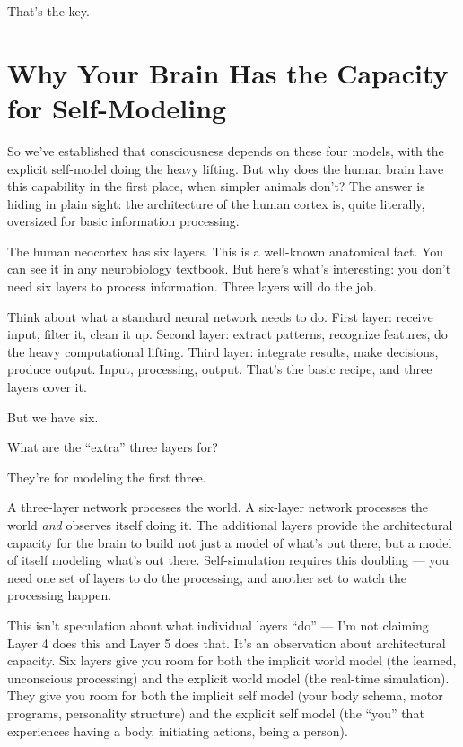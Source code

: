 \documentclass[11pt, twoside, openright]{book}
\begin{document}
That's the key.

\section*{Why Your Brain Has the Capacity\\for Self-Modeling}

So we've established that consciousness depends on these four models, with the explicit self-model doing the heavy lifting. But why does the human brain have this capability in the first place, when simpler animals don't? The answer is hiding in plain sight: the architecture of the human cortex is, quite literally, oversized for basic information processing.

The human neocortex has six layers. This is a well-known anatomical fact. You can see it in any neurobiology textbook. But here's what's interesting: you don't need six layers to process information. Three layers will do the job.

Think about what a standard neural network needs to do. First layer: receive input, filter it, clean it up. Second layer: extract patterns, recognize features, do the heavy computational lifting. Third layer: integrate results, make decisions, produce output. Input, processing, output. That's the basic recipe, and three layers cover it.

But we have six.

What are the ``extra'' three layers for?

They're for modeling the first three.

A three-layer network processes the world. A six-layer network processes the world \textit{and} observes itself doing it. The additional layers provide the architectural capacity for the brain to build not just a model of what's out there, but a model of itself modeling what's out there. Self-simulation requires this doubling --- you need one set of layers to do the processing, and another set to watch the processing happen.

This isn't speculation about what individual layers ``do'' --- I'm not claiming Layer 4 does this and Layer 5 does that. It's an observation about architectural capacity. Six layers give you room for both the implicit world model (the learned, unconscious processing) and the explicit world model (the real-time simulation). They give you room for both the implicit self model (your body schema, motor programs, personality structure) and the explicit self model (the ``you'' that experiences having a body, initiating actions, being a person).
\end{document}
